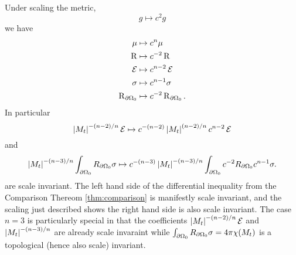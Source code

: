 \documentclass{amsart}
\begin{document}
\begin{rem}
Under scaling the metric,
\[
g \mapsto c^2 g
\]
we have
\begin{align*}
\mu &\mapsto c^n \mu \\
\operatorname{R} &\mapsto c^{-2} \operatorname{R} \\
\operatorname{\mathcal{E}} &\mapsto c^{n-2} \operatorname{\mathcal{E}} \\
\sigma &\mapsto c^{n-1} \sigma \\
\operatorname{R}_{\partial {\Omega_0}} &\mapsto c^{-2} \operatorname{R}_{\partial {\Omega_0}}.
\end{align*}
In particular
\[
\left|{M_t}\right|^{-(n-2)/n} \operatorname{\mathcal{E}} \mapsto c^{-(n-2)} \left|{M_t}\right|^{(n-2)/n} c^{n-2}\operatorname{\mathcal{E}}
\]
and
\[
\left|{M_t}\right|^{-(n-3)/n} \int_{\partial {\Omega_0}} R_{\partial {\Omega_0}}\sigma \mapsto c^{-(n-3)} \left|{M_t}\right|^{-(n-3)/n} \int_{\partial {\Omega_0}} c^{-2} R_{\partial {\Omega_0}} c^{n-1}\sigma.
\]
are scale invariant. The left hand side of the differential inequality from the Comparison Thereom \ref{thm:comparison} is manifestly scale invariant, and the scaling just described shows the right hand side is also scale invariant. The case \(n = 3\) is particularly special in that the coefficients \(\left|{M_t}\right|^{-(n-2)/n} \operatorname{\mathcal{E}}\) and \(\left|{M_t}\right|^{-(n-3)/n}\) are already scale invaraint while \(\int_{\partial {\Omega_0}} R_{\partial {\Omega_0}}\sigma = 4\pi \chi(M_t)\) is a topological (hence also scale) invariant.
\end{rem}
\end{document}
